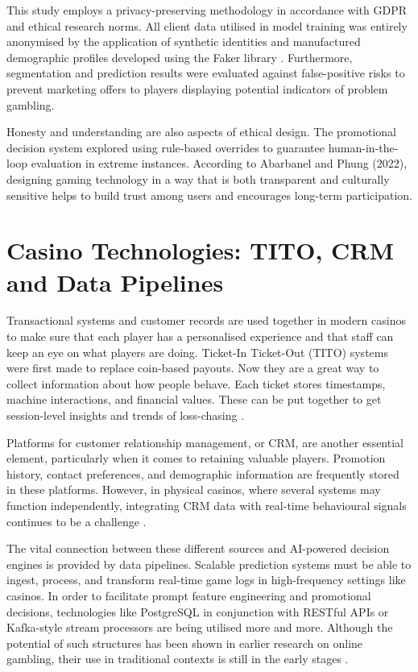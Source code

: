\documentclass[12pt,a4paper]{report}
\begin{document}
This study employs a privacy-preserving methodology in accordance with GDPR and ethical research norms. All client data utilised in model training was entirely anonymised by the application of synthetic identities and manufactured demographic profiles developed using the Faker library \citep{faker2025}. Furthermore, segmentation and prediction results were evaluated against false-positive risks to prevent marketing offers to players displaying potential indicators of problem gambling.

Honesty and understanding are also aspects of ethical design.  The promotional decision system explored using rule-based overrides to guarantee human-in-the-loop evaluation in extreme instances.  According to Abarbanel and Phung (2022), designing gaming technology in a way that is both transparent and culturally sensitive helps to build trust among users and encourages long-term participation.

\section{Casino Technologies: TITO, CRM and Data Pipelines}

Transactional systems and customer records are used together in modern casinos to make sure that each player has a personalised experience and that staff can keep an eye on what players are doing.  Ticket-In Ticket-Out (TITO) systems were first made to replace coin-based payouts. Now they are a great way to collect information about how people behave.  Each ticket stores timestamps, machine interactions, and financial values. These can be put together to get session-level insights and trends of loss-chasing \citep{Nemis2024}.

Platforms for customer relationship management, or CRM, are another essential element, particularly when it comes to retaining valuable players.  Promotion history, contact preferences, and demographic information are frequently stored in these platforms.  However, in physical casinos, where several systems may function independently, integrating CRM data with real-time behavioural signals continues to be a challenge \citep{Wayne2024}.

The vital connection between these different sources and AI-powered decision engines is provided by data pipelines.  Scalable prediction systems must be able to ingest, process, and transform real-time game logs in high-frequency settings like casinos.  In order to facilitate prompt feature engineering and promotional decisions, technologies like PostgreSQL in conjunction with RESTful APIs or Kafka-style stream processors are being utilised more and more.  Although the potential of such structures has been shown in earlier research on online gambling, their use in traditional contexts is still in the early stages \citep{Omike2022a}.
\end{document}
